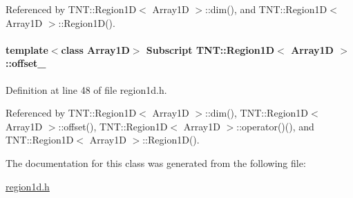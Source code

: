 Referenced by TNT::Region1D$<$ Array1D $>$::dim(), and TNT::Region1D$<$ Array1D $>$::Region1D().

\paragraph[{offset\_\-}]{\setlength{\rightskip}{0pt plus 5cm}template$<$class Array1D$>$ {\bf Subscript} {\bf TNT::Region1D}$<$ Array1D $>$::{\bf offset\_\-}}\hfill\label{class_t_n_t_1_1_region1_d_a2b432162eac654e84e7ef6b780d3dea1}


Definition at line 48 of file region1d.h.



Referenced by TNT::Region1D$<$ Array1D $>$::dim(), TNT::Region1D$<$ Array1D $>$::offset(), TNT::Region1D$<$ Array1D $>$::operator()(), and TNT::Region1D$<$ Array1D $>$::Region1D().



The documentation for this class was generated from the following file:\begin{DoxyCompactItemize}
\item 
\hyperlink{region1d_8h}{region1d.h}\end{DoxyCompactItemize}
